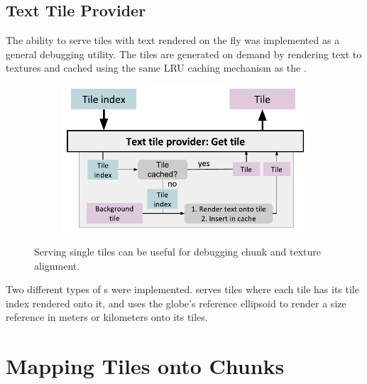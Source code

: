 \subsection{Text Tile Provider}
The ability to serve tiles with text rendered on the fly was implemented as a general debugging utility. The tiles are generated on demand by rendering text to textures and cached using the same LRU caching mechanism as the .

\begin{figure}[htbp]
    \centering
    \begin{subfigure}[bt]{0.8\textwidth}
        \includegraphics[width=\textwidth]{figures/implementation/tileprovider/texttileprovider_gettile.pdf}
    \end{subfigure}
    \caption{Serving single tiles can be useful for debugging chunk and texture alignment.}
    \label{fig:texttileprovider_gettile}
\end{figure}

Two different types of s were implemented.  serves tiles where each tile has its tile index rendered onto it, and  uses the globe's reference ellipsoid to render a size reference in meters or kilometers onto its tiles.


\section{Mapping Tiles onto Chunks}
  
